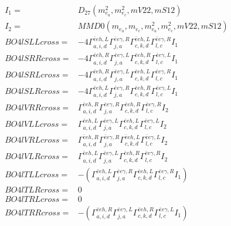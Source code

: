 \documentclass[A4,landscape]{article}
\begin{document}
\begin{align} 
I_1 = & D_{27}(m^2_{e_{{a}}}, m^2_{e_{{c}}}, mV22, mS12) \\ 
I_2 = & MMD0(m_{e_{{a}}}, m_{e_{{c}}}, m^2_{e_{{a}}}, m^2_{e_{{c}}}, mV22, mS12) \\ 
  BO4lSLLcross= & -4  \Gamma^{\bar{e}e h ,L}_{a, i, d} \Gamma^{\bar{e}e \gamma ,R}_{j, a} \Gamma^{\bar{e}e h ,L}_{c, k, d} \Gamma^{\bar{e}e \gamma ,R}_{l, c} I_1 \\ 
  BO4lSRRcross= & -4  \Gamma^{\bar{e}e h ,R}_{a, i, d} \Gamma^{\bar{e}e \gamma ,L}_{j, a} \Gamma^{\bar{e}e h ,R}_{c, k, d} \Gamma^{\bar{e}e \gamma ,L}_{l, c} I_1 \\ 
  BO4lSRLcross= & -4  \Gamma^{\bar{e}e h ,R}_{a, i, d} \Gamma^{\bar{e}e \gamma ,L}_{j, a} \Gamma^{\bar{e}e h ,L}_{c, k, d} \Gamma^{\bar{e}e \gamma ,R}_{l, c} I_1 \\ 
  BO4lSLRcross= & -4  \Gamma^{\bar{e}e h ,L}_{a, i, d} \Gamma^{\bar{e}e \gamma ,R}_{j, a} \Gamma^{\bar{e}e h ,R}_{c, k, d} \Gamma^{\bar{e}e \gamma ,L}_{l, c} I_1 \\ 
  BO4lVRRcross= &  \Gamma^{\bar{e}e h ,R}_{a, i, d} \Gamma^{\bar{e}e \gamma ,R}_{j, a} \Gamma^{\bar{e}e h ,R}_{c, k, d} \Gamma^{\bar{e}e \gamma ,R}_{l, c} I_2 \\ 
  BO4lVLLcross= &  \Gamma^{\bar{e}e h ,L}_{a, i, d} \Gamma^{\bar{e}e \gamma ,L}_{j, a} \Gamma^{\bar{e}e h ,L}_{c, k, d} \Gamma^{\bar{e}e \gamma ,L}_{l, c} I_2 \\ 
  BO4lVRLcross= &  \Gamma^{\bar{e}e h ,R}_{a, i, d} \Gamma^{\bar{e}e \gamma ,R}_{j, a} \Gamma^{\bar{e}e h ,L}_{c, k, d} \Gamma^{\bar{e}e \gamma ,L}_{l, c} I_2 \\ 
  BO4lVLRcross= &  \Gamma^{\bar{e}e h ,L}_{a, i, d} \Gamma^{\bar{e}e \gamma ,L}_{j, a} \Gamma^{\bar{e}e h ,R}_{c, k, d} \Gamma^{\bar{e}e \gamma ,R}_{l, c} I_2 \\ 
  BO4lTLLcross= & -( \Gamma^{\bar{e}e h ,L}_{a, i, d} \Gamma^{\bar{e}e \gamma ,R}_{j, a} \Gamma^{\bar{e}e h ,L}_{c, k, d} \Gamma^{\bar{e}e \gamma ,R}_{l, c} I_1) \\ 
  BO4lTLRcross= & 0 \\ 
  BO4lTRLcross= & 0 \\ 
  BO4lTRRcross= & -( \Gamma^{\bar{e}e h ,R}_{a, i, d} \Gamma^{\bar{e}e \gamma ,L}_{j, a} \Gamma^{\bar{e}e h ,R}_{c, k, d} \Gamma^{\bar{e}e \gamma ,L}_{l, c} I_1) \\ 
\end{align} 
\end{document}

